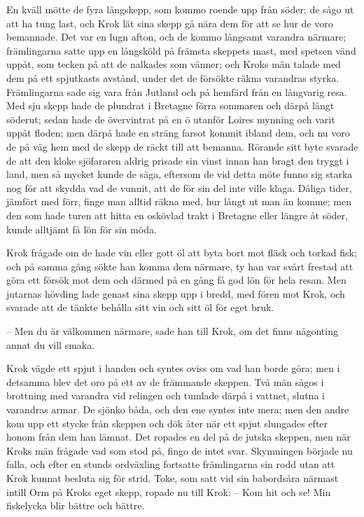 \initial En kväll mötte de fyra långskepp, som kommo roende upp från söder; de sågo ut att ha tung last, och Krok lät sina skepp gå nära dem för att se hur de voro bemannade. Det var en lugn afton, och de kommo långsamt varandra närmare; främlingarna satte upp en långsköld på främsta skeppets mast, med spetsen vänd uppåt, som tecken på att de nalkades som vänner; och Kroks män talade med dem på ett spjutkasts avstånd, under det de försökte räkna varandras styrka. Främlingarna sade sig vara från Jutland och på hemfärd från en långvarig resa. Med sju skepp hade de plundrat i Bretagne förra sommaren och därpå långt söderut; sedan hade de övervintrat på en ö utanför Loires mynning och varit uppåt floden; men därpå hade en sträng farsot kommit ibland dem, och nu voro de på väg hem med de skepp de räckt till att bemanna. Rörande sitt byte svarade de att den kloke sjöfararen aldrig prisade sin vinst innan han bragt den tryggt i land, men så mycket kunde de säga, eftersom de vid detta möte funno sig starka nog för att skydda vad de vunnit, att de för sin del inte ville klaga. Dåliga tider, jämfört med förr, finge man alltid räkna med, hur långt ut man än komme; men den som hade turen att hitta en oskövlad trakt i Bretagne eller längre åt söder, kunde alltjämt få lön för sin möda.

\initial Krok frågade om de hade vin eller gott öl att byta bort mot fläsk och torkad fisk; och på samma gång sökte han komma dem närmare, ty han var svårt frestad att göra ett försök mot dem och därmed på en gång få god lön för hela resan. Men jutarnas hövding lade genast sina skepp upp i bredd, med fören mot Krok, och svarade att de tänkte behålla sitt vin och sitt öl för eget bruk.

– Men du är välkommen närmare, sade han till Krok, om det finns någonting annat du vill smaka.

\initial Krok vägde ett spjut i handen och syntes oviss om vad han borde göra; men i detsamma blev det oro på ett av de främmande skeppen. Två män sågos i brottning med varandra vid relingen och tumlade därpå i vattnet, slutna i varandras armar. De sjönko båda, och den ene syntes inte mera; men den andre kom upp ett stycke från skeppen och dök åter när ett spjut slungades efter honom från dem han lämnat. Det ropades en del på de jutska skeppen, men när Kroks män frågade vad som stod på, fingo de intet svar. Skymningen började nu falla, och efter en stunds ordväxling fortsatte främlingarna sin rodd utan att Krok kunnat besluta sig för strid. Toke, som satt vid sin babordsåra närmast intill Orm på Kroks eget skepp, ropade nu till Krok:
– Kom hit och se! Min fiskelycka blir bättre och bättre.

